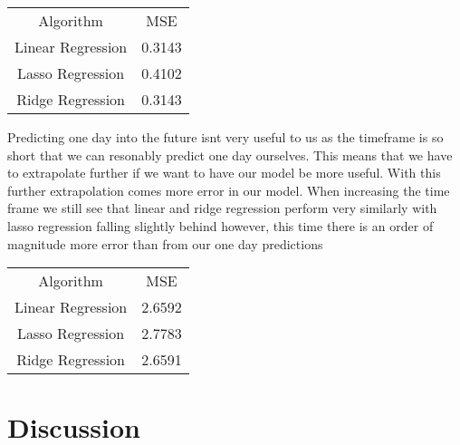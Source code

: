 \documentclass{report}
\begin{document}
\begin{minipage} {\linewidth}
\bigskip
\centering
{}
\begin{tabular}{c c}
    Algorithm & MSE \\
    Linear Regression & 0.3143 \\
    Lasso Regression & 0.4102 \\
    Ridge Regression & 0.3143
\end{tabular}
\bigskip
\end{minipage}

Predicting one day into the future isnt very useful to us as the timeframe is so short that we can resonably predict one day ourselves. This means that we have to extrapolate further if we want to have our model be more useful.
With this further extrapolation comes more error in our model.
When increasing the time frame we still see that linear and ridge regression perform very similarly with lasso regression falling slightly behind however, this time there is an order of magnitude more error than from our one day predictions

\begin{minipage} {\linewidth}
\bigskip
\centering
{}
\begin{tabular}{c c}
    Algorithm & MSE \\
    Linear Regression & 2.6592 \\
    Lasso Regression & 2.7783 \\
    Ridge Regression & 2.6591
\end{tabular}
\bigskip
\end{minipage}


\section{Discussion}
\end{document}
